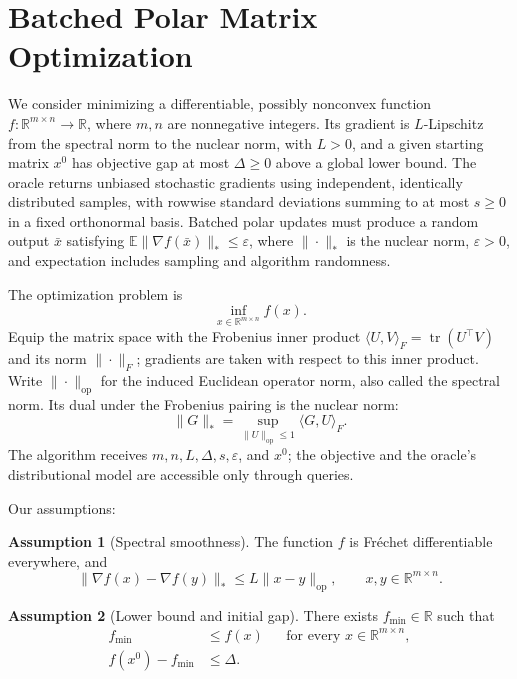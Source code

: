 \documentclass[10pt]{article}
\theoremstyle{definition}
\newtheorem{assumption}{Assumption}
\begin{document}
\section*{Batched Polar Matrix Optimization}
We consider minimizing a differentiable, possibly nonconvex function $f:\mathbb{R}^{m\times n}\to\mathbb{R}$, where $m,n$ are nonnegative integers. Its gradient is $L$-Lipschitz from the spectral norm to the nuclear norm, with $L>0$, and a given starting matrix $x^0$ has objective gap at most $\Delta\geq0$ above a global lower bound. The oracle returns unbiased stochastic gradients using independent, identically distributed samples, with rowwise standard deviations summing to at most $s\geq0$ in a fixed orthonormal basis. Batched polar updates must produce a random output $\bar{x}$ satisfying $\mathbb{E}\|\nabla f(\bar{x})\|_*\leq\varepsilon$, where $\|\cdot\|_*$ is the nuclear norm, $\varepsilon>0$, and expectation includes sampling and algorithm randomness.

The optimization problem is
\[
\inf_{x\in\mathbb{R}^{m\times n}} f(x).
\]
Equip the matrix space with the Frobenius inner product $\langle U,V\rangle_F=\operatorname{tr}(U^\top V)$ and its norm $\|\cdot\|_F$; gradients are taken with respect to this inner product. Write $\|\cdot\|_{\mathrm{op}}$ for the induced Euclidean operator norm, also called the spectral norm. Its dual under the Frobenius pairing is the nuclear norm:
\[
\|G\|_* = \sup_{\|U\|_{\mathrm{op}}\leq1}\langle G,U\rangle_F.
\]
The algorithm receives $m,n,L,\Delta,s,\varepsilon$, and $x^0$; the objective and the oracle's distributional model are accessible only through queries.

Our assumptions:
\begin{assumption}[Spectral smoothness]
The function $f$ is Fr\'echet differentiable everywhere, and
\[
\|\nabla f(x)-\nabla f(y)\|_*
\leq L\|x-y\|_{\mathrm{op}},
\qquad x,y\in\mathbb{R}^{m\times n}.
\]
\end{assumption}

\begin{assumption}[Lower bound and initial gap]
There exists $f_{\min}\in\mathbb{R}$ such that
\[
\begin{aligned}
f_{\min}&\leq f(x) &&\text{for every }x\in\mathbb{R}^{m\times n},\\
f(x^0)-f_{\min}&\leq\Delta.
\end{aligned}
\]
\end{assumption}
\end{document}

